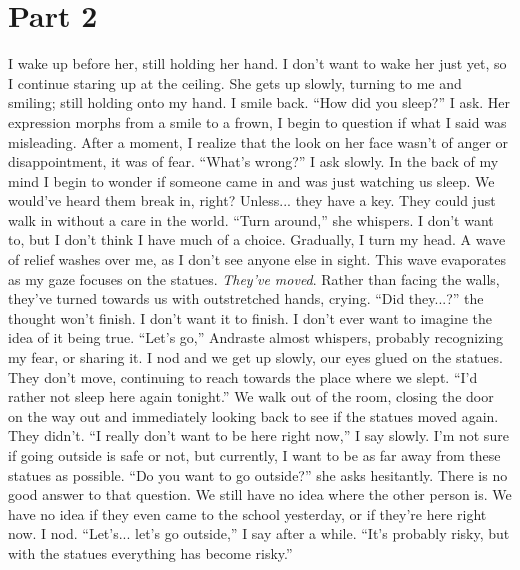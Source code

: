 \documentclass[a4paper, 12pt]{book}
\newcommand\tab[1][1cm]{\hspace*{#1}}
\begin{document}
\section*{Part 2}
\tab
I wake up before her, still holding her hand. I don’t want to wake her just yet, so I continue staring up at the ceiling. She gets up slowly, turning to me and smiling; still holding onto my hand. I smile back. ``How did you sleep?'' I ask. Her expression morphs from a smile to a frown, I begin to question if what I said was misleading. After a moment, I realize that the look on her face wasn’t of anger or disappointment, it was of fear. ``What’s wrong?'' I ask slowly. In the back of my mind I begin to wonder if someone came in and was just watching us sleep. We would’ve heard them break in, right? Unless... they have a key. They could just walk in without a care in the world.
\newline
\tab
``Turn around,'' she whispers. I don’t want to, but I don’t think I have much of a choice.
\newline
\tab
Gradually, I turn my head. A wave of relief washes over me, as I don’t see anyone else in sight. This wave evaporates as my gaze focuses on the statues. \textit{They’ve moved}. Rather than facing the walls, they’ve turned towards us with outstretched hands, crying. ``Did they...?'' the thought won’t finish. I don’t want it to finish. I don’t ever want to imagine the idea of it being true.
\newline
\tab
``Let’s go,'' Andraste almost whispers, probably recognizing my fear, or sharing it. I nod and we get up slowly, our eyes glued on the statues. They don’t move, continuing to reach towards the place where we slept. ``I’d rather not sleep here again tonight.''
\newline
\tab
We walk out of the room, closing the door on the way out and immediately looking back to see if the statues moved again. They didn’t. ``I really don’t want to be here right now,'' I say slowly. I’m not sure if going outside is safe or not, but currently, I want to be as far away from these statues as possible.
\newline
\tab
``Do you want to go outside?'' she asks hesitantly.  There is no good answer to that question. We still have no idea where the other person is. We have no idea if they even came to the school yesterday, or if they’re here right now.
\newline
\tab
I nod. ``Let’s... let’s go outside,'' I say after a while. ``It’s probably risky, but with the statues everything has become risky.''
\end{document}
